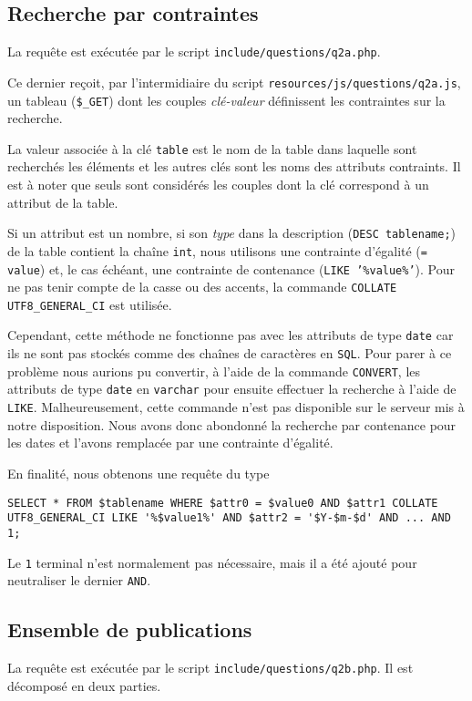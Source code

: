 \documentclass[a4paper, 12pt]{article}
\begin{document}
    \subsection{Recherche par contraintes}
    La requête est exécutée par le script \texttt{include/questions/q2a.php}.
    
    Ce dernier reçoit, par l'intermidiaire du script \texttt{resources/js/questions/q2a.js}, un tableau (\texttt{\$\_GET}) dont les couples \emph{clé-valeur} définissent les contraintes sur la recherche. \par
    La valeur associée à la clé \texttt{table} est le nom de la table dans laquelle sont recherchés les éléments et les autres clés sont les noms des attributs contraints. Il est à noter que seuls sont considérés les couples dont la clé correspond à un attribut de la table. \par
    Si un attribut est un nombre, \cad{} si son \emph{type} dans la description (\texttt{DESC tablename;}) de la table contient la chaîne \texttt{int}, nous utilisons une contrainte d'égalité (\texttt{= value}) et, le cas échéant, une contrainte de contenance (\texttt{LIKE '\%value\%'})\footnotemark{}. Pour ne pas tenir compte de la casse ou des accents, la commande \texttt{COLLATE UTF8\_GENERAL\_CI} est utilisée. \par
    Cependant, cette méthode ne fonctionne pas avec les attributs de type \texttt{date} car ils ne sont pas stockés comme des chaînes de caractères en \texttt{SQL}. Pour parer à ce problème nous aurions pu convertir, à l'aide de la commande \texttt{CONVERT}, les attributs de type \texttt{date} en \texttt{varchar} pour ensuite effectuer la recherche à l'aide de \texttt{LIKE}. Malheureusement, cette commande n'est pas disponible sur le serveur mis à notre disposition. Nous avons donc abondonné la recherche par contenance pour les dates et l'avons remplacée par une contrainte d'égalité. \par
    En finalité, nous obtenons une requête du type
    \begin{lstlisting}[style=sql, gobble=8]
        SELECT * FROM $tablename WHERE $attr0 = $value0 AND $attr1 COLLATE UTF8_GENERAL_CI LIKE '%$value1%' AND $attr2 = '$Y-$m-$d' AND ... AND 1;
    \end{lstlisting}
    Le \texttt{1} terminal n'est normalement pas nécessaire, mais il a été ajouté pour neutraliser le dernier \texttt{AND}.
    \subsection{Ensemble de publications}
    La requête est exécutée par le script \texttt{include/questions/q2b.php}. Il est décomposé en deux parties.
\end{document}
